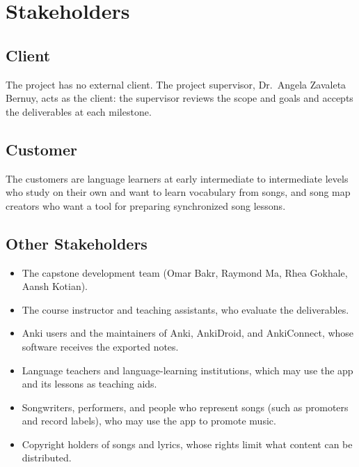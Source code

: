 \documentclass[12pt]{article}
\begin{document}
\section{Stakeholders}
\subsection{Client}
The project has no external client. The project supervisor, Dr.~Angela Zavaleta
Bernuy, acts as the client: the supervisor reviews the scope and goals and
accepts the deliverables at each milestone.

\subsection{Customer}
The customers are language learners at early intermediate to intermediate
levels who study on their own and want to learn vocabulary from songs, and song
map creators who want a tool for preparing synchronized song lessons.

\subsection{Other Stakeholders}
\begin{itemize}
    \item The \progname{} capstone development team (Omar Bakr, Raymond Ma,
          Rhea Gokhale, Aansh Kotian).
    \item The course instructor and teaching assistants, who evaluate the
          deliverables.
    \item Anki users and the maintainers of Anki, AnkiDroid, and AnkiConnect,
          whose software receives the exported notes.
    \item Language teachers and language-learning institutions, which may use
          the app and its lessons as teaching aids.
    \item Songwriters, performers, and people who represent songs (such as
          promoters and record labels), who may use the app to promote music.
    \item Copyright holders of songs and lyrics, whose rights limit what
          content can be distributed.
\end{itemize}
\end{document}
